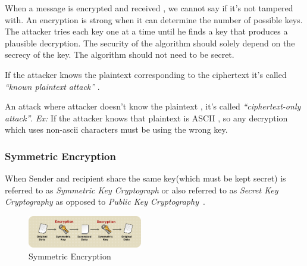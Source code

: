\documentclass[12pt]{report}
\begin{document}
When a message is encrypted and received , we cannot say if it's not tampered with. An encryption is strong when 
it can determine the number of possible keys. The attacker tries each key one at a time until he finds a key that 
produces a plausible decryption. The security of the algorithm should solely depend on the secrecy of the key. 
The algorithm should not need to be secret.

If the attacker knows the plaintext corresponding to the ciphertext it's called \textit{``known plaintext attack''} .

An attack where attacker doesn't know the plaintext , it's called \textit{``ciphertext-only attack''}.
\textit{Ex:} If the attacker knows that plaintext is ASCII , so any decryption which uses non-ascii characters must be using the wrong key.
\subsubsection{Symmetric Encryption}
When Sender and recipient share the same key(which must be kept secret) is referred to as \textit{Symmetric Key Cryptograph} or also
referred to as \textit{Secret Key Cryptography} as opposed to \textit{Public Key Cryptography}~\cite{eric}.
\begin{figure}[h]
    \centering
    \includegraphics[width=50mm]{Images/symmetric.png}
    \caption{Symmetric Encryption ~\cite{RedHat:Symmetric}}
\end{figure}
\end{document}

